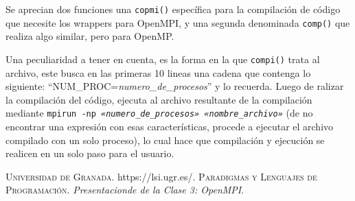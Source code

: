 \documentclass{article}
\begin{document}
Se aprecian dos funciones una \texttt{copmi()} espec\'ifica para la compilaci\'on
de c\'odigo que necesite los wrappers para OpenMPI, y una segunda denominada
\texttt{comp()} que realiza algo similar, pero para OpenMP.

Una peculiaridad a tener en cuenta, es la forma en la que \texttt{compi()}
trata al archivo, este busca en las primeras 10 lineas una cadena que contenga
lo siguiente: ``NUM\_PROC=\textit{numero\_de\_procesos}'' y lo recuerda. Luego de
ralizar la compilaci\'on del c\'odigo, ejecuta al archivo resultante de
la compilaci\'on mediante \texttt{mpirun -np \textit{«numero\_de\_procesos»
«nombre\_archivo»}} (de no encontrar una expresi\'on con esas caracter\'isticas,
procede a ejecutar el archivo compilado con un solo proceso), lo cual hace que compilaci\'on y
ejecuci\'on se realicen en un solo paso para el usuario.


\newpage
\begin{thebibliography}{99}
	 \textsc{Universidad de
Granada}. https://lsi.ugr.es/.
	\textsc{Paradigmas y
Lenguajes de Programaci\'on}. \textit{Presentacionde de la Clase 3: OpenMPI}.
\end{thebibliography}
\end{document}

